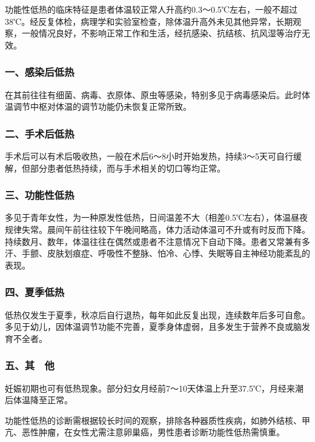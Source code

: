 功能性低热的临床特征是患者体温较正常人升高约0.3～0.5℃左右，一般不超过38℃。经反复体检，病理学和实验室检查，除体温升高外未见其他异常，长期观察，一般情况良好，不影响正常工作和生活，经抗感染、抗结核、抗风湿等治疗无效。

\subsubsection{一、感染后低热}

在其前往往有细菌、病毒、衣原体、原虫等感染，特别多见于病毒感染后。此时体温调节中枢对体温的调节功能仍未恢复正常所致。

\subsubsection{二、手术后低热}

手术后可以有术后吸收热，一般在术后6～8小时开始发热，持续3～5天可自行缓解，但部分患者低热持续，而与手术相关的切口等均正常。

\subsubsection{三、功能性低热}

多见于青年女性，为一种原发性低热，日间温差不大（相差0.5℃左右），体温昼夜规律失常。晨间午前往往较下午晚间略高，体力活动体温可不升或有时反而下降。持续数月、数年，体温往往在偶然或患者不注意情况下自动下降。患者又常兼有多汗、手颤、皮肤划痕症、呼吸性不整脉、怕冷、心悸、失眠等自主神经功能紊乱的表现。

\subsubsection{四、夏季低热}

低热仅发生于夏季，秋凉后自行退热，每年如此反复出现，连续数年后多可自愈。多见于幼儿，因体温调节功能不完善，夏季身体虚弱，且多发生于营养不良或脑发育不全者。

\subsubsection{五、其　他}

妊娠初期也可有低热现象。部分妇女月经前7～10天体温上升至37.5℃，月经来潮后体温降至正常。

功能性低热的诊断需根据较长时间的观察，排除各种器质性疾病，如肺外结核、甲亢、恶性肿瘤，在女性尤需注意卵巢癌，男性患者诊断功能性低热需慎重。

\protect\hypertarget{text00042.html}{}{}

